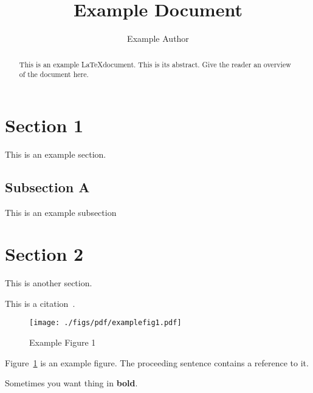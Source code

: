\documentclass[11pt,twocolumn,letterpaper]{article}
\begin{document}
\title{Example Document}

\author{Example Author}

\maketitle

\begin{abstract}
This is an example \LaTeX document. This is its abstract. Give the
reader an overview of the document here.
\end{abstract}

\section{Section 1}
\label{sec:section1}

This is an example section.

\subsection{Subsection A}
\label{sec:section1A}

This is an example subsection

\section{Section 2}
\label{sec:section2}

This is another section.

\noindent
This is a citation~\cite{exampleref1}.



\begin{figure}[htb]
  \centering
  \texttt{[image: ./figs/pdf/examplefig1.pdf]}
  \caption{Example Figure 1}
  \label{fig:example1}
\end{figure}

\noindent
Figure~\ref{fig:example1} is an example figure. The proceeding
sentence contains a reference to it.

\noindent
Sometimes you want thing in {\bf bold}.
\end{document}
